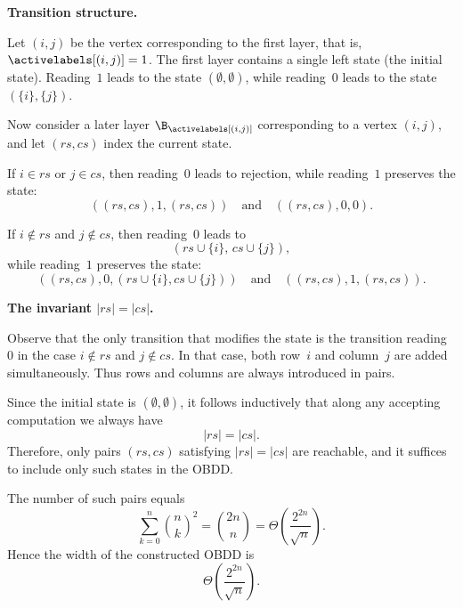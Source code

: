 \medskip
\noindent\textbf{Transition structure.}

Let $(i,j)$ be the vertex corresponding to the first layer, that is,
$\activelabels[(i,j)] = 1$. The first layer contains a single left state
(the initial state). Reading~$1$ leads to the state $(\emptyset,\emptyset)$,
while reading~$0$ leads to the state $(\{i\},\{j\})$.

Now consider a later layer $\B_{\activelabels[(i,j)]}$ corresponding to a
vertex $(i,j)$, and let $(rs,cs)$ index the current state.

If $i \in rs$ or $j \in cs$, then reading~$0$ leads to rejection, while
reading~$1$ preserves the state:
\[
((rs,cs),1,(rs,cs))
\quad\text{and}\quad
((rs,cs),0,0).
\]

If $i \notin rs$ and $j \notin cs$, then reading~$0$ leads to
\[
(rs \cup \{i\},\, cs \cup \{j\}),
\]
while reading~$1$ preserves the state:
\[
((rs,cs),0,(rs \cup \{i\}, cs \cup \{j\}))
\quad\text{and}\quad
((rs,cs),1,(rs,cs)).
\]

\medskip
\noindent\textbf{The invariant $|rs| = |cs|$.}

Observe that the only transition that modifies the state is the transition
reading~$0$ in the case $i \notin rs$ and $j \notin cs$. In that case,
both row~$i$ and column~$j$ are added simultaneously.
Thus rows and columns are always introduced in pairs.

Since the initial state is $(\emptyset,\emptyset)$, it follows inductively that
along any accepting computation we always have
\[
|rs| = |cs|.
\]
Therefore, only pairs $(rs,cs)$ satisfying $|rs|=|cs|$ are reachable, and it
suffices to include only such states in the OBDD.

The number of such pairs equals
\[
\sum_{k=0}^{n} \binom{n}{k}^2
= \binom{2n}{n}
= \Theta\!\left(\frac{2^{2n}}{\sqrt{n}}\right).
\]
Hence the width of the constructed OBDD is
\[
\Theta\!\left(\frac{2^{2n}}{\sqrt{n}}\right).
\]





